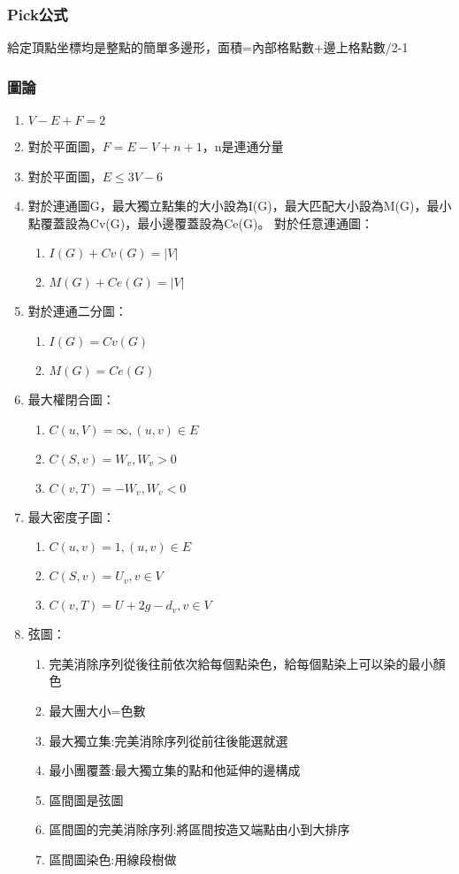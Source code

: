 %

\subsubsection{Pick公式}
給定頂點坐標均是整點的簡單多邊形，面積=內部格點數+邊上格點數/2-1

\subsubsection{圖論}
\begin{enumerate}\itemsep = -5pt
\item $V-E+F=2$
\item 對於平面圖，$F=E-V+n+1$，n是連通分量
\item 對於平面圖，$E\leq 3V-6$
\item 對於連通圖G，最大獨立點集的大小設為I(G)，最大匹配大小設為M(G)，最小點覆蓋設為Cv(G)，最小邊覆蓋設為Ce(G)。
對於任意連通圖：
	\begin{enumerate}\itemsep = -5pt
	\item $I(G)+Cv(G)=|V|$
	\item $M(G)+Ce(G)=|V|$
	\end{enumerate}
\item 對於連通二分圖：
	\begin{enumerate}\itemsep = -5pt
	\item $I(G)=Cv(G)$
	\item $M(G)=Ce(G)$
	\end{enumerate}
\item 最大權閉合圖：
	\begin{enumerate}\itemsep = -5pt
	\item $C(u,V)=\infty ,(u,v)\in E$
	\item $C(S,v)=W_v ,W_v>0$
	\item $C(v,T)=-W_v ,W_v<0$
	\end{enumerate}
\item 最大密度子圖：
	\begin{enumerate}\itemsep = -5pt
	\item $C(u,v)=1 ,(u,v)\in E$
	\item $C(S,v)=U_v ,v \in V$
	\item $C(v,T)=U+2g-d_v ,v \in V$
	\end{enumerate}
\item 弦圖：
	\begin{enumerate}\itemsep = -5pt
	\item 完美消除序列從後往前依次給每個點染色，給每個點染上可以染的最小顏色
	\item 最大團大小=色數
	\item 最大獨立集:完美消除序列從前往後能選就選
	\item 最小團覆蓋:最大獨立集的點和他延伸的邊構成
	\item 區間圖是弦圖
	\item 區間圖的完美消除序列:將區間按造又端點由小到大排序
	\item 區間圖染色:用線段樹做
	\end{enumerate}
\end{enumerate}

